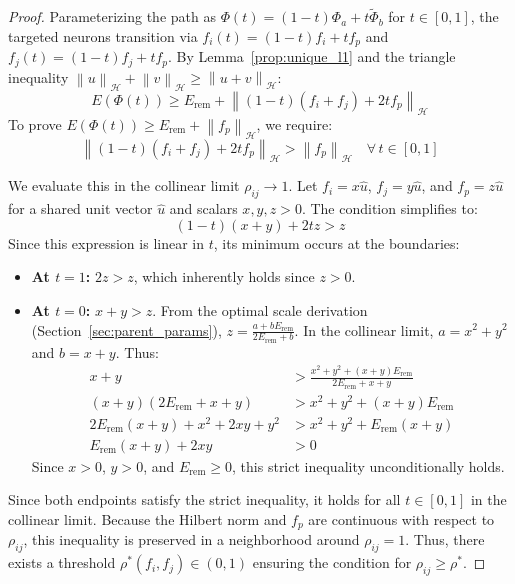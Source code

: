 \documentclass[11pt, a4paper, copyright, gdm]{google}
\newcommand{\norm}[1]{\left\lVert#1\right\rVert}
\newcommand{\calH}{\mathcal{H}}
\theoremstyle{definition}
\begin{document}
\begin{proof}
Parameterizing the path as $\Phi(t) = (1-t)\Phi_a + t\tilde{\Phi}_b$ for $t \in [0, 1]$, the targeted neurons transition via $f_i(t) = (1-t)f_i + t f_p$ and $f_j(t) = (1-t)f_j + t f_p$. By Lemma~\ref{prop:unique_l1} and the triangle inequality $\norm{u}_\calH + \norm{v}_\calH \ge \norm{u+v}_\calH$:
\begin{equation*}
    E(\Phi(t)) \ge E_{\text{rem}} + \norm{(1-t)(f_i + f_j) + 2tf_p}_\calH
\end{equation*}
To prove $E(\Phi(t)) \ge E_{\text{rem}} + \norm{f_p}_\calH$, we require:
\begin{equation} \label{eq:buffer_condition}
    \norm{(1-t)(f_i + f_j) + 2tf_p}_\calH > \norm{f_p}_\calH \quad \forall \, t \in [0, 1]
\end{equation}

We evaluate this in the collinear limit $\rho_{ij} \to 1$. Let $f_i = x \hat{u}$, $f_j = y \hat{u}$, and $f_p = z \hat{u}$ for a shared unit vector $\hat{u}$ and scalars $x, y, z > 0$. The condition simplifies to:
\begin{equation*}
    (1-t)(x+y) + 2tz > z
\end{equation*}
Since this expression is linear in $t$, its minimum occurs at the boundaries:
\begin{itemize}
    \item \textbf{At $t=1$:} $2z > z$, which inherently holds since $z > 0$.
    \item \textbf{At $t=0$:} $x+y > z$. From the optimal scale derivation (Section~\ref{sec:parent_params}), $z = \frac{a + b E_{\text{rem}}}{2E_{\text{rem}} + b}$. In the collinear limit, $a = x^2 + y^2$ and $b = x + y$. Thus:
    \begin{align*}
        x + y &> \frac{x^2 + y^2 + (x+y)E_{\text{rem}}}{2E_{\text{rem}} + x + y} \\
        (x+y)(2E_{\text{rem}} + x + y) &> x^2 + y^2 + (x+y)E_{\text{rem}} \\
        2E_{\text{rem}}(x+y) + x^2 + 2xy + y^2 &> x^2 + y^2 + E_{\text{rem}}(x+y) \\
        E_{\text{rem}}(x+y) + 2xy &> 0
    \end{align*}
    Since $x > 0$, $y > 0$, and $E_{\text{rem}} \ge 0$, this strict inequality unconditionally holds.
\end{itemize}

Since both endpoints satisfy the strict inequality, it holds for all $t \in [0, 1]$ in the collinear limit. Because the Hilbert norm and $f_p$ are continuous with respect to $\rho_{ij}$, this inequality is preserved in a neighborhood around $\rho_{ij} = 1$. Thus, there exists a threshold $\rho^*(f_i, f_j) \in (0, 1)$ ensuring the condition for $\rho_{ij} \ge \rho^*$.
\end{proof}
\end{document}
